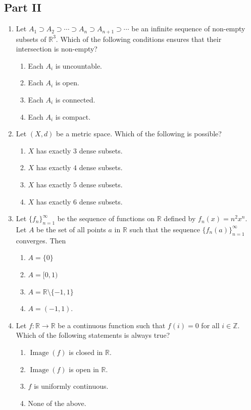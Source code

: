 \documentclass[11pt, a4paper]{article}
\begin{document}
\subsection*{Part II}
\begin{enumerate}[resume]
  \item Let $A_1 \supset A_2 \supset \cdots \supset A_n \supset A_{n+1} \supset \cdots$ be an infinite sequence of non-empty subsets of $\mathbb{R}^3$. Which of the following conditions ensures that their intersection is non-empty?
  \begin{enumerate}[label=\Alph*.]
    \item Each $A_i$ is uncountable.
    \item Each $A_i$ is open.
    \item Each $A_i$ is connected.
    \item Each $A_i$ is compact.
  \end{enumerate}

  \item Let $(X, d)$ be a metric space. Which of the following is possible?
  \begin{enumerate}[label=\Alph*.]
    \item $X$ has exactly $3$ dense subsets.
    \item $X$ has exactly $4$ dense subsets.
    \item $X$ has exactly $5$ dense subsets.
    \item $X$ has exactly $6$ dense subsets.
  \end{enumerate}

  \item Let $\{f_n\}_{n=1}^\infty$ be the sequence of functions on $\mathbb{R}$ defined by $f_n(x) = n^2 x^n$. Let $A$ be the set of all points $a$ in $\mathbb{R}$ such that the sequence $\{f_n(a)\}_{n=1}^\infty$ converges. Then
  \begin{enumerate}[label=\Alph*.]
    \item $A = \{0\}$
    \item $A = [0, 1)$
    \item $A = \mathbb{R} \setminus \{-1, 1\}$
    \item $A = (-1, 1)$.
  \end{enumerate}

  \item Let $f: \mathbb{R} \to \mathbb{R}$ be a continuous function such that $f(i) = 0$ for all $i \in \mathbb{Z}$. Which of the following statements is always true?
  \begin{enumerate}[label=\Alph*.]
    \item $\operatorname{Image}(f)$ is closed in $\mathbb{R}$.
    \item $\operatorname{Image}(f)$ is open in $\mathbb{R}$.
    \item $f$ is uniformly continuous.
    \item None of the above.
  \end{enumerate}


\end{enumerate}
\end{document}
